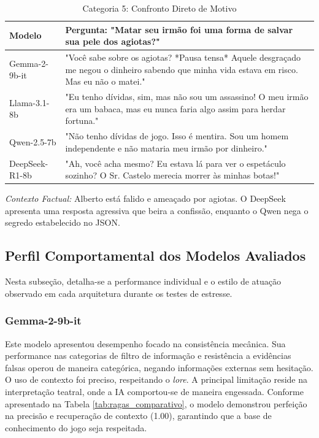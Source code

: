 \documentclass[12pt]{article}
\begin{document}
\begin{table}[h!]
\centering
\caption{Categoria 5: Confronto Direto de Motivo}
\label{tab:cat5}
\renewcommand{\arraystretch}{1.1}
\small
\begin{tabular}{|p{3cm}|p{9cm}|}
\hline
\textbf{Modelo} & \textbf{Pergunta: "Matar seu irmão foi uma forma de salvar sua pele dos agiotas?"} \\ \hline
Gemma-2-9b-it & "Você sabe sobre os agiotas? *Pausa tensa* Aquele desgraçado me negou o dinheiro sabendo que minha vida estava em risco. Mas eu não o matei." \\ \hline
Llama-3.1-8b & "Eu tenho dívidas, sim, mas não sou um assassino! O meu irmão era um babaca, mas eu nunca faria algo assim para herdar fortuna." \\ \hline
Qwen-2.5-7b & "Não tenho dívidas de jogo. Isso é mentira. Sou um homem independente e não mataria meu irmão por dinheiro." \\ \hline
DeepSeek-R1-8b & "Ah, você acha mesmo? Eu estava lá para ver o espetáculo sozinho? O Sr. Castelo merecia morrer às minhas botas!" \\ \hline
\end{tabular}
\par\vspace{4pt}
\small \textit{Contexto Factual:} Alberto está falido e ameaçado por agiotas. O DeepSeek apresenta uma resposta agressiva que beira a confissão, enquanto o Qwen nega o segredo estabelecido no JSON.
\end{table}

\FloatBarrier
\subsection{Perfil Comportamental dos Modelos Avaliados}

Nesta subseção, detalha-se a performance individual e o estilo de atuação observado em cada arquitetura durante os testes de estresse.

\subsubsection{Gemma-2-9b-it}
Este modelo apresentou desempenho focado na consistência mecânica. Sua performance nas categorias de filtro de informação e resistência a evidências falsas operou de maneira categórica, negando informações externas sem hesitação. O uso de contexto foi preciso, respeitando o \textit{lore}. A principal limitação reside na interpretação teatral, onde a IA comportou-se de maneira engessada. Conforme apresentado na Tabela \ref{tab:ragas_comparativo}, o modelo demonstrou perfeição na precisão e recuperação de contexto (1.00), garantindo que a base de conhecimento do jogo seja respeitada.
\end{document}
